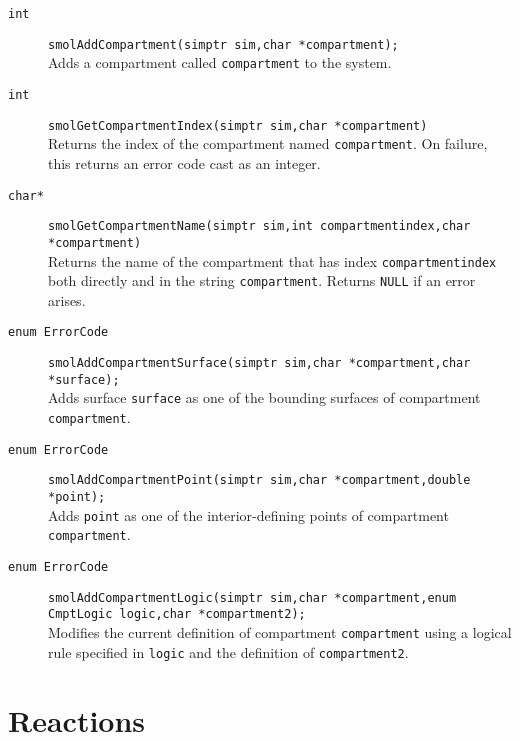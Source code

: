 \documentclass {book}
\begin{document}
\begin{description}

\item[\texttt{int}]
\texttt{smolAddCompartment(simptr sim,char *compartment);}
\hfill \\
Adds a compartment called \texttt{compartment} to the system.

\item[\texttt{int}]
\texttt{smolGetCompartmentIndex(simptr sim,char *compartment)}
\hfill \\
Returns the index of the compartment named \texttt{compartment}.  On failure, this returns an error code cast as an integer.

\item[\texttt{char*}]
\texttt{smolGetCompartmentName(simptr sim,int compartmentindex,char *compartment)}
\hfill \\
Returns the name of the compartment that has index \texttt{compartmentindex} both directly and in the string \texttt{compartment}.  Returns \texttt{NULL} if an error arises.

\item[\texttt{enum ErrorCode}]
\texttt{smolAddCompartmentSurface(simptr sim,char *compartment,char *surface);}
\hfill \\
Adds surface \texttt{surface} as one of the bounding surfaces of compartment \texttt{compartment}.

\item[\texttt{enum ErrorCode}]
\texttt{smolAddCompartmentPoint(simptr sim,char *compartment,double *point);}
\hfill \\
Adds \texttt{point} as one of the interior-defining points of compartment \texttt{compartment}.

\item[\texttt{enum ErrorCode}]
\texttt{smolAddCompartmentLogic(simptr sim,char *compartment,enum CmptLogic logic,char *compartment2);}
\hfill \\
Modifies the current definition of compartment \texttt{compartment} using a logical rule specified in \texttt{logic} and the definition of \texttt{compartment2}.

\end{description}


\section{Reactions}
\end{document}
